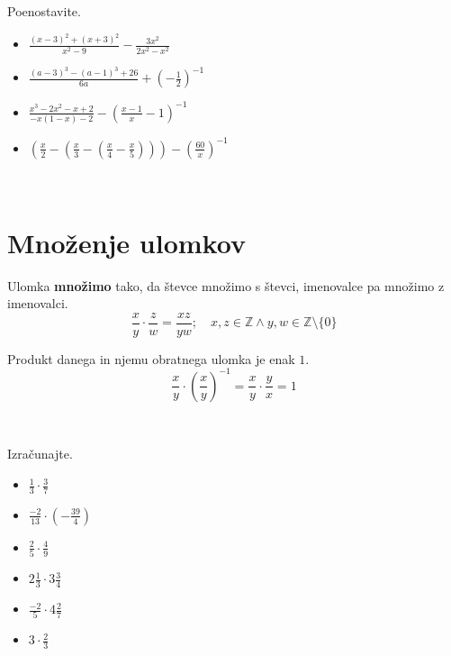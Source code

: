         
            \begin{naloga}
                Poenostavite.
                \begin{itemize}
                    \item $\frac{(x-3)^2+(x+3)^2}{x^2-9}-\frac{3x^2}{2x^2-x^2}$ 
                    \item $\frac{(a-3)^3-(a-1)^3+26}{6a}+\left(-\frac{1}{2}\right)^{-1}$ 
                    \item $\frac{x^3-2x^2-x+2}{-x(1-x)-2}-\left(\frac{x-1}{x}-1\right)^{-1}$ 
                    \item $\left(\frac{x}{2}-\left(\frac{x}{3}-\left(\frac{x}{4}-\frac{x}{5}\right)\right)\right)-\left(\frac{60}{x}\right)^{-1}$ 
                \end{itemize}
            \end{naloga}
        

            ~
        
        \section{Množenje ulomkov}


                Ulomka \textbf{množimo} tako, da števce množimo s števci, imenovalce pa množimo z imenovalci.
                $$\dfrac{x}{y}\cdot \dfrac{z}{w}=\dfrac{xz}{yw}; \quad x,z\in\mathbb{Z}\land y,w\in\mathbb{Z}\setminus\{0\}$$
                
            
                Produkt danega in njemu obratnega ulomka je enak $1$.
                $$\dfrac{x}{y}\cdot\left(\dfrac{x}{y}\right)^{-1}=\dfrac{x}{y}\cdot\dfrac{y}{x}=1$$
            
        
            ~

        
            \begin{naloga}
                Izračunajte.
                \begin{itemize}
                            \item $\frac{1}{3}\cdot \frac{3}{7}$ 
                            \item $\frac{-2}{13}\cdot \left(-\frac{39}{4}\right)$ 
                            \item $\frac{2}{5}\cdot \frac{4}{9}$ 
                            \item $2\frac{1}{3}\cdot 3\frac{3}{4}$ 
                            \item $\frac{-2}{5}\cdot 4\frac{2}{7}$ 
                            \item $3\cdot\frac{2}{3}$ 
                \end{itemize}
            \end{naloga}
        


